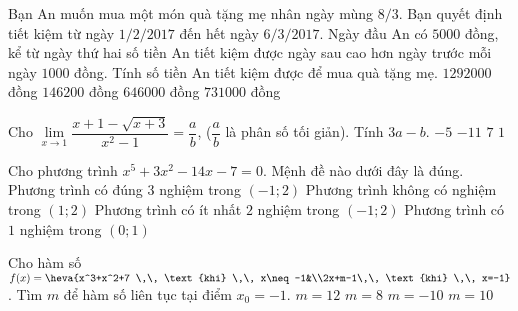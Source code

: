 \begin{ex}%
	Bạn An muốn mua một món quà tặng mẹ nhân ngày mùng $8/3$. Bạn quyết định tiết kiệm từ ngày $1/2/2017$ đến hết ngày $6/3/2017$. Ngày đầu An có $5000$ đồng, kể từ ngày thứ hai số tiền An tiết kiệm được ngày sau cao hơn ngày trước mỗi ngày $1000$ đồng. Tính số tiền An tiết kiệm được để mua quà tặng mẹ.
	\choice
	{$1292000$ đồng}
	{$146200$ đồng}
	{$646000$ đồng}
	{\True $731000$ đồng}
\end{ex}

\begin{ex}%
	Cho $\lim \limits_{x\to 1} \dfrac{x+1-\sqrt{x+3}}{x^2-1}=\dfrac{a}{b}$, ($\dfrac{a}{b}$ là phân số tối giản). Tính $3a-b$.
	\choice
	{$ -5$}
	{$ -11$}
	{$7$}
	{\True $1$}
\end{ex}

\begin{ex}%
	Cho phương trình $x^5+3x^2-14x-7=0$. Mệnh đề nào dưới đây là đúng.
	\choice
	{Phương trình có đúng $3$ nghiệm trong $\left(-1;2\right)$}
	{Phương trình không có nghiệm trong $\left(1;2\right)$}
	{\True Phương trình có ít nhất $2$ nghiệm trong $\left(-1;2\right)$}
	{Phương trình có  $1$ nghiệm trong $\left(0;1\right)$}
\end{ex}

\begin{ex}%
	Cho hàm số $f(x)=\heva{x^3+x^2+7 \,\, \text{khi} \,\, x\neq -1&\\2x+m-1\,\, \text{khi} \,\, x=-1}$. Tìm $m$ để hàm số liên tục tại điểm $x_0=-1$.
	\choice
	{$m=12$}
	{$m=8$}
	{$m=-10$}
	{\True $m=10$}
\end{ex}

